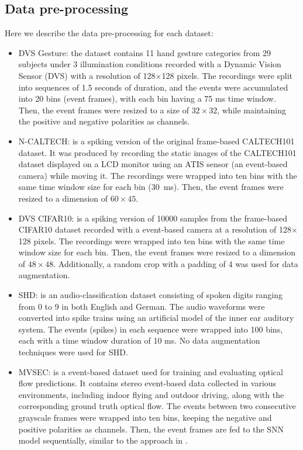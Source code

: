 \documentclass[10pt]{article} %
\begin{document}
        \subsection{Data pre-processing}\label{sec:data_preprocessing}
        Here we describe the data pre-processing for each dataset:
        \begin{itemize}
            \item DVS Gesture: the dataset contains 11 hand gesture categories from 29 subjects under 3 illumination conditions recorded with a Dynamic Vision Sensor (DVS) with a resolution of 128$\times$128 pixels. The recordings were split into sequences of 1.5 seconds of duration, and the events were accumulated into 20 bins (event frames), with each bin having a 75 ms time window.
            Then, the event frames were resized to a size of $32\times32$, while maintaining the positive and negative polarities as channels.
            \item N-CALTECH: is a spiking version of the original frame-based CALTECH101 dataset. It was produced by recording the static images of the CALTECH101 dataset displayed on a LCD monitor using an ATIS sensor (an event-based camera) while moving it. The recordings were wrapped into ten bins with the same time window size for each bin (30~ms).
            Then, the event frames were resized to a dimension of $60\times45$.
            \item DVS CIFAR10: is a spiking version of 10000 samples from the frame-based CIFAR10 dataset recorded with a event-based camera at a resolution of 128$\times$128 pixels. The recordings were wrapped into ten bins with the same time window size for each bin.
            Then, the event frames were resized to a dimension of $48\times48$.
            Additionally, a random crop with a padding of 4 was used for data augmentation.
            \item SHD: is an audio-classification dataset consisting of spoken digits ranging from 0 to 9 in both English and German. The audio waveforms were converted into spike trains using an artificial model of the inner ear auditory system. The events (spikes) in each sequence were wrapped into 100 bins, each with a time window duration of 10 ms.
            No data augmentation techniques were used for SHD.
            \item MVSEC: is a event-based dataset used for training and evaluating optical flow predictions. 
            It contains stereo event-based data collected in various environments, including indoor flying and outdoor driving, along with the corresponding ground truth optical flow. The events between two consecutive grayscale frames were wrapped into ten bins, keeping the negative and positive polarities as channels.
            Then, the event frames are fed to the SNN model sequentially, similar to the approach in \cite{Apolinario2023Hardware/SoftwareNetworks}.
        \end{itemize}
\end{document}
